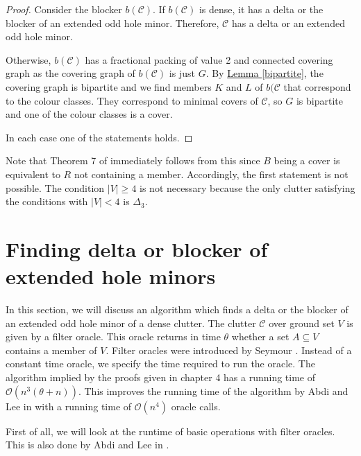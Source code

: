 \documentclass[a4paper, 12pt]{scrbook}
\theoremstyle{definition}
\begin{document}
   \begin{proof}
       Consider the blocker $b(\mathcal{C})$.
       If $b(\mathcal{C})$ is dense, it has a delta or the blocker of an extended odd hole minor.
       Therefore, $\mathcal{C}$ has a delta or an extended odd hole minor.

       Otherwise, $b(\mathcal{C})$ has a fractional packing of value 2 and connected covering graph as the covering graph of $b(\mathcal{C})$ is just $G$.
       By \hyperref[bipartite]{Lemma \ref*{bipartite}}, the covering graph is bipartite and we find members $K$ and $L$ of $b(\mathcal{C}$ that correspond to the colour classes. They correspond to minimal covers of $\mathcal{C}$, so $G$ is bipartite and one of the colour classes is a cover.

       In each case one of the statements holds.
   \end{proof}

   Note that Theorem 7 of \cite{deltas} immediately follows from this since $B$ being a cover is equivalent to $R$ not containing a member. Accordingly, the first statement is not possible. The condition $|V|\geq 4$ is not necessary because the only clutter satisfying the conditions with $|V|<4$ is $\Delta_3$.

   \chapter{Finding delta or blocker of extended hole minors}
   In this section, we will discuss an algorithm which finds a delta or the blocker of an extended odd hole minor of a dense clutter.
   The clutter $\mathcal{C}$ over ground set $V$ is given by a filter oracle.
   This oracle returns in time $\theta$ whether a set $A \subseteq V$ contains a member of $V$.
   Filter oracles were introduced by Seymour \cite{seymour}. Instead of a constant time oracle, we specify the time required to run the oracle.
   The algorithm implied by the proofs given in chapter 4 has a running time of $\mathcal{O}(n^3(\theta+n))$.
   This improves the running time of the algorithm by Abdi and Lee in \cite{deltas} with a running time of $\mathcal{O}(n^4)$ oracle calls.


   First of all, we will look at the runtime of basic operations with filter oracles. This is also done by Abdi and Lee in \cite{deltas}.
\end{document}
